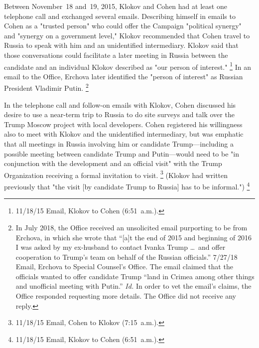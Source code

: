Between November~18 and~19, 2015, Klokov and Cohen had at least one telephone call and exchanged several emails.
Describing himself in emails to Cohen as a "trusted person" who could offer the Campaign "political synergy" and "synergy on a government level," Klokov recommended that Cohen travel to Russia to speak with him and an unidentified intermediary.
Klokov said that those conversations could facilitate a later meeting in Russia between the candidate and an individual Klokov described as "our person of interest."%
\footnote{11/18/15 Email, Klokov to Cohen (6:51~a.m.).}
In an email to the Office, Erchova later identified the "person of interest" as Russian President Vladimir Putin.%
\footnote{In July 2018, the Office received an unsolicited email purporting to be from Erchova, in which she wrote that ``[a]t the end of 2015 and beginning of 2016 I was asked by my ex-husband to contact Ivanka Trump \dots\ and offer cooperation to Trump's team on behalf of the Russian officials.''
7/27/18 Email, Erchova to Special Counsel's Office.
The email claimed that the officials wanted to offer candidate Trump ``land in Crimea among other things and unofficial meeting with Putin.''
\textit{Id.}
In order to vet the email's claims, the Office responded requesting more details.
The Office did not receive any reply.}

In the telephone call and follow-on emails with Klokov, Cohen discussed his desire to use a near-term trip to Russia to do site surveys and talk over the Trump Moscow project with local developers.
Cohen registered his willingness also to meet with Klokov and the unidentified intermediary, but was emphatic that all meetings in Russia involving him or candidate Trump---including a possible meeting between candidate Trump and Putin---would need to be "in conjunction with the development and an official visit" with the Trump Organization receiving a formal invitation to visit.%
\footnote{11/18/15 Email, Cohen to Klokov (7:15~a.m.).}
(Klokov had written previously that "the visit [by candidate Trump to Russia] has to be informal.")%
\footnote{11/18/15 Email, Klokov to Cohen (6:51~a.m.).}


